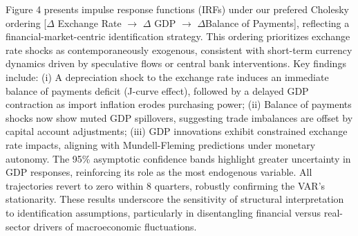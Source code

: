 \documentclass[
]{article}
\begin{document}
Figure 4 presents impulse response functions (IRFs) under our prefered Cholesky 
ordering [$\Delta$ Exchange Rate $\rightarrow$ $\Delta$ GDP
$\rightarrow$ $\Delta$Balance of Payments],
reflecting a financial-market-centric identification strategy. This ordering 
prioritizes exchange rate shocks as contemporaneously exogenous, consistent
with short-term currency dynamics driven by speculative flows or central bank 
interventions. Key findings include: (i) A depreciation shock to the exchange
rate induces an immediate balance of payments deficit (J-curve effect), followed 
by a delayed GDP contraction as import inflation erodes purchasing power; (ii) 
Balance of payments shocks now show muted GDP spillovers, suggesting trade imbalances 
are offset by capital account adjustments; (iii) GDP innovations exhibit constrained 
exchange rate impacts, aligning with Mundell-Fleming predictions under monetary autonomy. 
The 95\% asymptotic confidence bands highlight greater uncertainty in GDP responses,
reinforcing its role as the most endogenous variable. All trajectories revert to zero 
within 8 quarters, robustly confirming the VAR’s stationarity. These results underscore 
the sensitivity of structural interpretation to identification assumptions, particularly 
in disentangling financial versus real-sector drivers of macroeconomic fluctuations.
\end{document}
